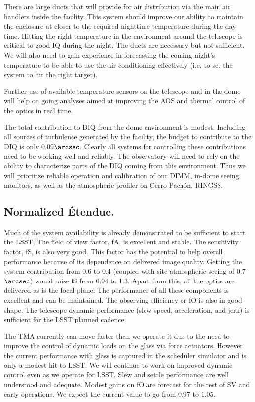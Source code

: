There are large ducts that will provide for air distribution via the main air handlers inside the facility. This system should improve our ability to maintain the enclosure at closer to the required nighttime temperature during the day time. Hitting the right temperature in the environment around the telescope is critical to good IQ during the night. The ducts are necessary but not sufficient. We will also need to gain experience in forecasting the coming night's temperature to be able to use the air conditioning effectively (i.e. to set the system to hit the right target). 

Further use of available temperature sensors on the telescope and in the dome will help on going analyses aimed at improving the AOS and thermal control of the optics in real time. 

The total contribution to DIQ from the dome environment is modest. Including all sources of turbulence generated by the facility, the budget to contribute to the DIQ is only 0.09$\arcsec$. Clearly all systems for controlling these contributions need to be working well and reliably. The observatory will need to rely on the ability to characterize parts of the DIQ coming from this environment. Thus we will prioritize reliable operation and calibration of our DIMM, in-dome seeing monitors, as well as the atmospheric profiler on Cerro Pach\'{on}, RINGSS.  

\subsection{Normalized \'{E}tendue.}
Much of the system availability is already demonstrated to be sufficient to start the LSST, The field of view factor, fA, is excellent and stable. The sensitivity factor, fS, is also very good. This factor has the potential to help overall performance because of its dependence on delivered image quality. Getting the system contribution from 0.6 to 0.4 (coupled with site atmospheric seeing of 0.7$\arcsec$) would raise fS from 0.94 to 1.3. Apart from this, all the optics are delivered as is the focal plane. The performance of all these components is excellent and can be maintained. The observing efficiency or fO is also in good shape. The telescope dynamic performance (slew speed, acceleration, and jerk) is sufficient for the LSST planned cadence. 

The TMA currently can move faster than we operate it due to the need to improve the control of dynamic loads on the glass via force actuators. However the current performance with glass is captured in the scheduler simulator and is only a modest hit to LSST. We will continue to work on improved dynamic control even as we operate for LSST. Slew and settle performance are well understood and adequate. Modest gains on fO are forecast for the rest of SV and early operations. We expect the current value to go from 0.97 to 1.05. 


